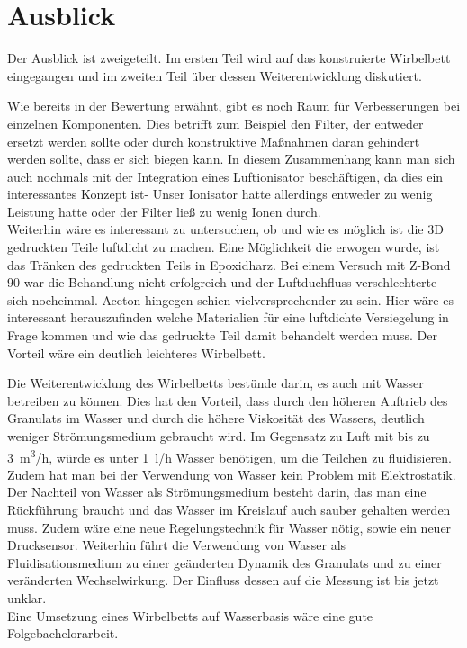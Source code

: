 \section{Ausblick}

Der Ausblick ist zweigeteilt. Im ersten Teil wird auf das konstruierte Wirbelbett eingegangen und im zweiten Teil über dessen Weiterentwicklung diskutiert. 

Wie bereits in der Bewertung erwähnt, gibt es noch Raum für Verbesserungen bei einzelnen Komponenten. Dies betrifft zum Beispiel den Filter, der entweder ersetzt werden sollte oder durch konstruktive Maßnahmen daran gehindert werden sollte, dass er sich biegen kann. In diesem Zusammenhang kann man sich auch nochmals mit der Integration eines Luftionisator beschäftigen, da dies ein interessantes Konzept ist- Unser Ionisator hatte allerdings entweder zu wenig Leistung hatte oder der Filter ließ zu wenig Ionen durch. \\
Weiterhin wäre es interessant zu untersuchen, ob und wie es möglich ist die 3D gedruckten Teile luftdicht zu machen. Eine Möglichkeit die erwogen wurde, ist das Tränken des gedruckten Teils in Epoxidharz. Bei einem Versuch mit Z-Bond 90 war die Behandlung nicht erfolgreich und der Luftduchfluss verschlechterte sich nocheinmal. Aceton hingegen schien vielversprechender zu sein. Hier wäre es interessant herauszufinden welche Materialien für eine luftdichte Versiegelung in Frage kommen und wie das gedruckte Teil damit behandelt werden muss. Der Vorteil wäre ein deutlich leichteres Wirbelbett.

Die Weiterentwicklung des Wirbelbetts bestünde darin, es auch mit Wasser betreiben zu können. Dies hat den Vorteil, dass durch den höheren Auftrieb des Granulats im Wasser und durch die höhere Viskosität des Wassers, deutlich weniger Strömungsmedium gebraucht wird. Im Gegensatz zu Luft mit bis zu \SI{3}{m^3/h}, würde es unter \SI{1}{l/h} Wasser benötigen, um die Teilchen zu fluidisieren. Zudem hat man bei der Verwendung von Wasser kein Problem mit Elektrostatik. \\
Der Nachteil von Wasser als Strömungsmedium besteht darin, das man eine Rückführung braucht und das Wasser im Kreislauf auch sauber gehalten werden muss. Zudem wäre eine neue Regelungstechnik für Wasser nötig, sowie ein neuer Drucksensor. Weiterhin führt die Verwendung von Wasser als Fluidisationsmedium zu einer geänderten Dynamik des Granulats und zu einer veränderten Wechselwirkung. Der Einfluss dessen auf die Messung ist bis jetzt unklar.  \\
Eine Umsetzung eines Wirbelbetts auf Wasserbasis wäre eine gute Folgebachelorarbeit.



